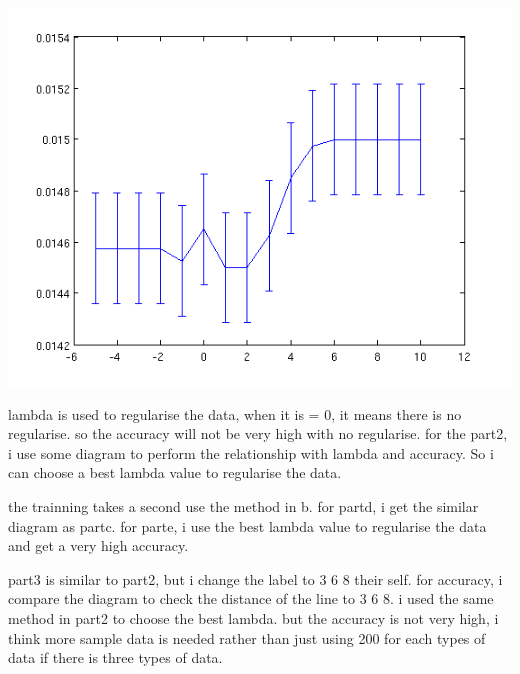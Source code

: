 \documentclass[a4paper]{article}
\begin{document}
\includegraphics[scale=0.2]{6}

lambda is used to regularise the data, when it is = 0, it means there is no regularise.
so the accuracy will not be very high with no regularise.
for the part2, i use some diagram to perform the relationship with lambda and
accuracy. So i can choose a best lambda value to regularise the data.

the trainning takes a second use the method in b.
for partd, i get the similar diagram as partc.
for parte, i use the best lambda value to regularise the data and get a very high accuracy.


part3 is similar to part2, but i change the label to 3 6 8 their self.
for accuracy, i compare the diagram to check the distance of the line to 3 6 8.
i used the same method in part2 to choose the best lambda.
but the accuracy is not very high, i think more sample data is needed rather than
just using 200 for each types of data if there is three types of data. 
\end{document}
